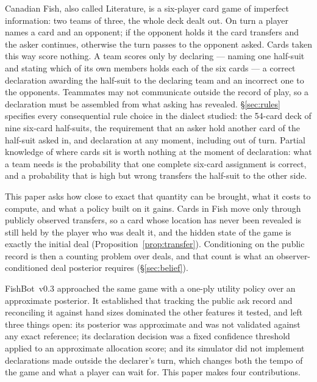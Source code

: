 \documentclass[11pt]{article}
\theoremstyle{definition}
\DeclareRobustCommand{\vthree}{\texorpdfstring{\mbox{FishBot v0.3}}{FishBot v0.3}}
\begin{document}
Canadian Fish, also called Literature, is a six-player card game of imperfect
information: two teams of three, the whole deck dealt out. On turn a player names
a card and an opponent; if the opponent holds it the card transfers and the
asker continues, otherwise the turn passes to the opponent asked. Cards taken
this way score nothing. A team scores only by declaring --- naming one half-suit
and stating which of its own members holds each of the six cards --- a correct
declaration awarding the half-suit to the declaring team and an incorrect one to
the opponents. Teammates may not communicate outside the record of play, so a
declaration must be assembled from what asking has revealed. \S\ref{sec:rules}
specifies every consequential rule choice in the dialect studied: the 54-card
deck of nine six-card half-suits, the requirement that an asker hold another card
of the half-suit asked in, and declaration at any moment, including out of turn.
Partial knowledge of where cards sit is worth nothing at the moment of
declaration: what a team needs is the probability that one complete six-card
assignment is correct, and a probability that is high but wrong transfers the
half-suit to the other side.

This paper asks how close to exact that quantity can be brought, what it costs to
compute, and what a policy built on it gains. Cards in Fish move only through
publicly observed transfers, so a card whose location has never been revealed is
still held by the player who was dealt it, and the hidden state of the game is
exactly the initial deal (Proposition~\ref{prop:transfer}). Conditioning on the
public record is then a counting problem over deals, and that count is what an
observer-conditioned deal posterior requires (\S\ref{sec:belief}).

\vthree{} \cite{fishbot03} approached the same game with a one-ply utility policy
over an approximate posterior. It established that tracking the public ask record
and reconciling it against hand sizes dominated the other features it tested, and
left three things open: its posterior was approximate and was not validated
against any exact reference; its declaration decision was a fixed confidence
threshold applied to an approximate allocation score; and its simulator did not
implement declarations made outside the declarer's turn, which changes both the
tempo of the game and what a player can wait for. This paper makes four
contributions.
\end{document}
